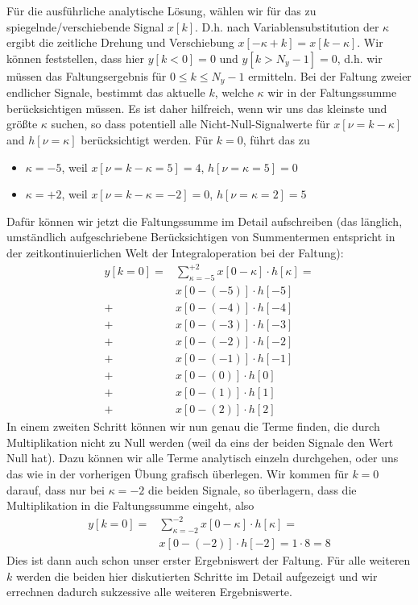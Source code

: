 \clearpage
Für die ausführliche analytische Lösung, wählen wir für das zu spiegelnde/verschiebende
Signal $x[k]$.
D.h. nach Variablensubstitution der $\kappa$ ergibt die zeitliche
Drehung und Verschiebung $x[-\kappa+k]=x[k-\kappa]$.
%
Wir können feststellen, dass hier $y[k<0]=0$ und $y[k>N_y-1]=0$, d.h.
wir müssen das Faltungsergebnis für $0\leq k \leq N_y-1$ ermitteln.
%
Bei der Faltung zweier endlicher Signale, bestimmt das aktuelle $k$, welche $\kappa$
wir in der Faltungssumme berücksichtigen müssen.
Es ist daher hilfreich, wenn wir uns das kleinste und größte $\kappa$ suchen,
so dass potentiell alle Nicht-Null-Signalwerte für $x[\nu=k-\kappa]$ and $h[\nu=\kappa]$
berücksichtigt werden.
Für $k=0$, führt das zu
\begin{itemize}
\item $\kappa=-5$, weil $x[\nu=k-\kappa=5]=4$, $h[\nu=\kappa=5]=0$
\item $\kappa=+2$, weil $x[\nu=k-\kappa=-2]=0$, $h[\nu=\kappa=2]=5$
\end{itemize}
Dafür können wir jetzt die Faltungssumme im Detail aufschreiben
(das länglich, umständlich aufgeschriebene Berücksichtigen von Summentermen
entspricht in der zeitkontinuierlichen Welt der Integraloperation bei der Faltung):
%
\begin{align}
y[k=0] = &\sum\limits_{\kappa = -5}^{+2} x[0 -\kappa] \cdot h[\kappa] =\\
&x[0 -(-5)] \cdot h[-5]\nonumber\\
+&x[0 -(-4)] \cdot h[-4]\nonumber\\
+&x[0 -(-3)] \cdot h[-3]\nonumber\\
+&x[0 -(-2)] \cdot h[-2]\nonumber\\
+&x[0 -(-1)] \cdot h[-1]\nonumber\\
+&x[0 -(0)] \cdot h[0]\nonumber\\
+&x[0 -(1)] \cdot h[1]\nonumber\\
+&x[0 -(2)] \cdot h[2]
\end{align}
In einem zweiten Schritt können wir nun genau die Terme finden, die durch
Multiplikation nicht zu Null werden (weil da eins der beiden Signale den Wert
Null hat).
Dazu können wir alle Terme analytisch einzeln durchgehen, oder uns das wie
in der vorherigen Übung grafisch überlegen.
Wir kommen für $k=0$ darauf, dass nur bei $\kappa=-2$ die beiden Signale, so
überlagern, dass die Multiplikation in die Faltungssumme eingeht, also
\begin{align}
y[k=0] = & \sum\limits_{\kappa = -2}^{-2} x[0 -\kappa] \cdot h[\kappa] =\\
&x[0 -(-2)] \cdot h[-2] = 1 \cdot 8 = 8\nonumber
\end{align}
Dies ist dann auch schon unser erster Ergebniswert der Faltung. Für alle weiteren
$k$ werden die beiden hier diskutierten Schritte im Detail aufgezeigt und
wir errechnen dadurch sukzessive alle weiteren Ergebniswerte.

